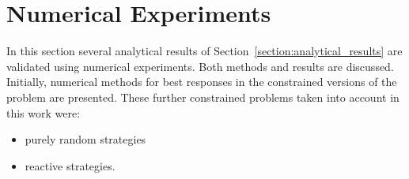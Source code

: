 \documentclass[10pt]{article}
\newtheorem{lemma}[theorem]{Lemma}
\begin{document}





 


\section{Numerical Experiments}

In this section several analytical results of Section~\ref{section:analytical_results}
are validated using numerical experiments. Both methods and results are discussed.
Initially, numerical methods for best responses in the constrained versions of
the problem are presented. These further constrained problems taken into account
in this work were:

\begin{itemize}
    \item purely random strategies
    \item reactive strategies.
\end{itemize}
\end{document}
